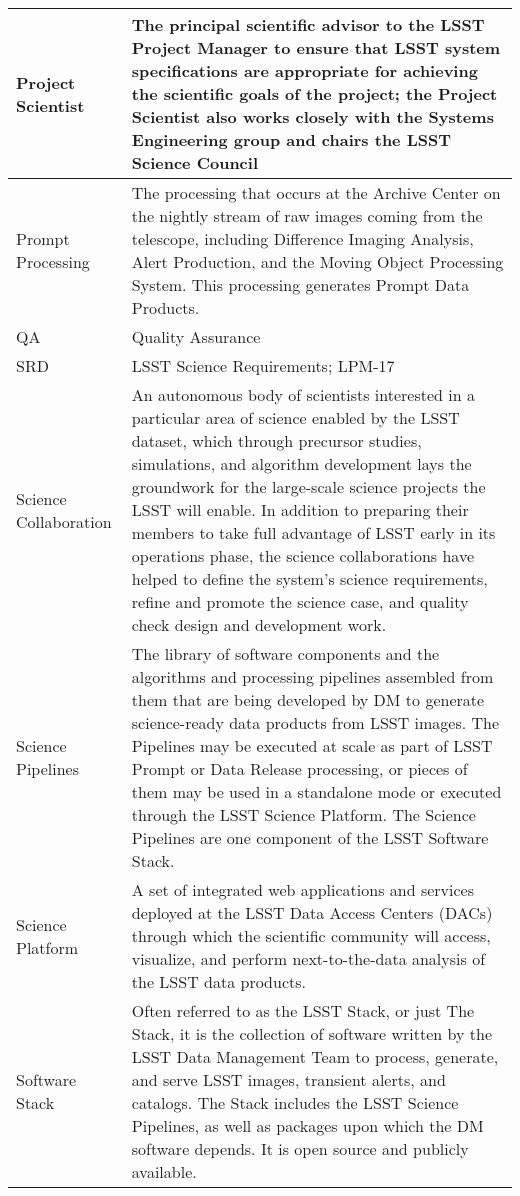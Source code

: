 \begin{longtable}{|l|p{}|}
Project Scientist & The principal scientific advisor to the \gls{LSST} \gls{Project Manager} to ensure that \gls{LSST} system specifications are appropriate for achieving the scientific goals of the project; the \gls{Project Scientist} also works closely with the \gls{Systems Engineering} group and chairs the \gls{LSST} Science Council \\\hline
Prompt Processing & The processing that occurs at the \gls{Archive} \gls{Center} on the nightly stream of raw images coming from the telescope, including Difference Imaging Analysis, \gls{Alert} Production, and the Moving \gls{Object} Processing System. This processing generates Prompt Data Products. \\\hline
QA & Quality Assurance \\\hline
SRD & \gls{LSST} Science Requirements; LPM-17 \\\hline
Science Collaboration & An autonomous body of scientists interested in a particular area of science enabled by the \gls{LSST} dataset, which through precursor studies, simulations, and \gls{algorithm} development lays the groundwork for the large-scale science projects the \gls{LSST} will enable.  In addition to preparing their members to take full advantage of \gls{LSST} early in its operations phase, the science collaborations have helped to define the system's science requirements, refine and promote the science case, and quality check design and development work. \\\hline
Science Pipelines & The library of software components and the algorithms and processing pipelines assembled from them that are being developed by \gls{DM} to generate science-ready data products from \gls{LSST} images. The Pipelines may be executed at scale as part of \gls{LSST} Prompt or \gls{Data Release} processing, or pieces of them may be used in a standalone mode or executed through the \gls{LSST} \gls{Science Platform}. The \gls{Science Pipelines} are one component of the \gls{LSST} \gls{Software Stack}. \\\hline
Science Platform & A set of integrated web applications and services deployed at the \gls{LSST} Data Access Centers (DACs) through which the scientific community will access, visualize, and perform next-to-the-data analysis of the \gls{LSST} data products. \\\hline
Software Stack & Often referred to as the \gls{LSST} Stack, or just The Stack, it is the collection of software written by the \gls{LSST} \gls{Data Management} Team to process, generate, and serve \gls{LSST} images, \gls{transient} alerts, and catalogs. The Stack includes the \gls{LSST} \gls{Science Pipelines}, as well as packages upon which the \gls{DM} software depends. It is open source and publicly available. \\\hline

\end{longtable}
